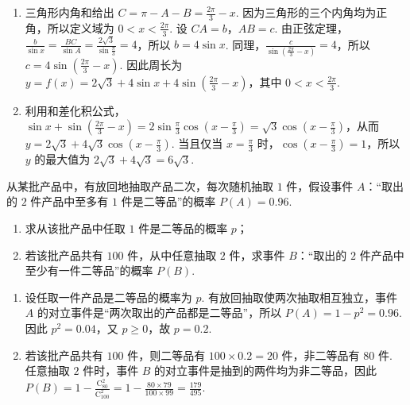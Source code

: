 \begin{solution}
\begin{enumerate}
\item 三角形内角和给出 \(C=\pi-A-B=\frac{2\pi}{3}-x\). 因为三角形的三个内角均为正角，所以定义域为 \(0<x<\frac{2\pi}{3}\). 设 \(CA=b\)，\(AB=c\). 由正弦定理，\(\frac{b}{\sin x}=\frac{BC}{\sin A}=\frac{2\sqrt{3}}{\sin\frac{\pi}{3}}=4\)，所以 \(b=4\sin x\). 同理，\(\frac{c}{\sin\left(\frac{2\pi}{3}-x\right)}=4\)，所以 \(c=4\sin\left(\frac{2\pi}{3}-x\right)\). 因此周长为 \(y=f(x)=2\sqrt{3}+4\sin x+4\sin\left(\frac{2\pi}{3}-x\right)\)，其中 \(0<x<\frac{2\pi}{3}\).
\item 利用和差化积公式，\(\sin x+\sin\left(\frac{2\pi}{3}-x\right)=2\sin\frac{\pi}{3}\cos\left(x-\frac{\pi}{3}\right)=\sqrt{3}\cos\left(x-\frac{\pi}{3}\right)\)，从而 \(y=2\sqrt{3}+4\sqrt{3}\cos\left(x-\frac{\pi}{3}\right)\). 当且仅当 \(x=\frac{\pi}{3}\) 时，\(\cos\left(x-\frac{\pi}{3}\right)=1\)，所以 \(y\) 的最大值为 \(2\sqrt{3}+4\sqrt{3}=6\sqrt{3}\).
\end{enumerate}
\end{solution}

\begin{problem}
从某批产品中，有放回地抽取产品二次，每次随机抽取 \(1\) 件，假设事件 \(A\)：“取出的 \(2\) 件产品中至多有 \(1\) 件是二等品”的概率 \(P(A)=0.96\).

\begin{enumerate}
\item 求从该批产品中任取 \(1\) 件是二等品的概率 \(p\)；
\item 若该批产品共有 \(100\) 件，从中任意抽取 \(2\) 件，求事件 \(B\)：“取出的 \(2\) 件产品中至少有一件二等品”的概率 \(P(B)\).
\end{enumerate}
\end{problem}

\begin{solution}
\begin{enumerate}
\item 设任取一件产品是二等品的概率为 \(p\). 有放回抽取使两次抽取相互独立，事件 \(A\) 的对立事件是“两次取出的产品都是二等品”，所以 \(P(A)=1-p^2=0.96\). 因此 \(p^2=0.04\)，又 \(p\geqslant0\)，故 \(p=0.2\).
\item 若该批产品共有 \(100\) 件，则二等品有 \(100\times0.2=20\) 件，非二等品有 \(80\) 件. 任意抽取 \(2\) 件时，事件 \(B\) 的对立事件是抽到的两件均为非二等品，因此 \(P(B)=1-\frac{\mathrm C_{80}^{2}}{\mathrm C_{100}^{2}}=1-\frac{80\times79}{100\times99}=\frac{179}{495}\).
\end{enumerate}
\end{solution}

